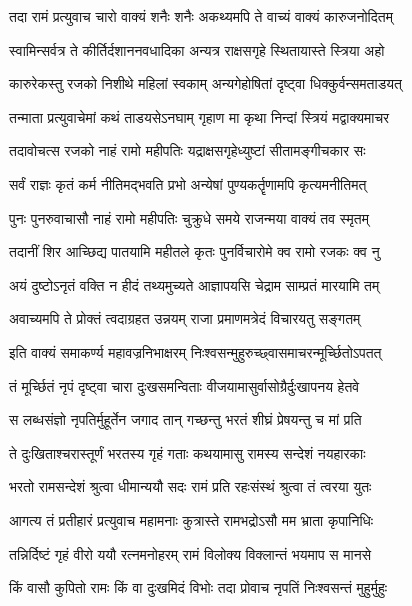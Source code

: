 \twolineshloka
{तदा रामं प्रत्युवाच चारो वाक्यं शनैः शनैः}
{अकथ्यमपि ते वाच्यं वाक्यं कारुजनोदितम्}%


\twolineshloka
{स्वामिन्सर्वत्र ते कीर्तिर्दशाननवधादिका}
{अन्यत्र राक्षसगृहे स्थितायास्ते स्त्रिया अहो}%

\twolineshloka
{कारुरेकस्तु रजको निशीथे महिलां स्वकाम्}
{अन्यगेहोषितां दृष्ट्वा धिक्कुर्वन्समताडयत्}%

\twolineshloka
{तन्माता प्रत्युवाचेमां कथं ताडयसेऽनघाम्}
{गृहाण मा कृथा निन्दां स्त्रियं मद्वाक्यमाचर}%

\twolineshloka
{तदावोचत्स रजको नाहं रामो महीपतिः}
{यद्राक्षसगृहेध्युष्टां सीतामङ्गीचकार सः}%

\twolineshloka
{सर्वं राज्ञः कृतं कर्म नीतिमद्भवति प्रभो}
{अन्येषां पुण्यकर्तॄणामपि कृत्यमनीतिमत्}%

\twolineshloka
{पुनः पुनरुवाचासौ नाहं रामो महीपतिः}
{चुक्रुधे समये राजन्मया वाक्यं तव स्मृतम्}%

\twolineshloka
{तदानीं शिर आच्छिद्य पातयामि महीतले}
{कृतः पुनर्विचारोमे क्व रामो रजकः क्व नु}%

\twolineshloka
{अयं दुष्टोऽनृतं वक्ति न हीदं तथ्यमुच्यते}
{आज्ञापयसि चेद्राम साम्प्रतं मारयामि तम्}%

\twolineshloka
{अवाच्यमपि ते प्रोक्तं त्वदाग्रहत उन्नयम्}
{राजा प्रमाणमत्रेदं विचारयतु सङ्गतम्}%


\twolineshloka
{इति वाक्यं समाकर्ण्य महावज्रनिभाक्षरम्}
{निःश्वसन्मुहुरुच्छ्वासमाचरन्मूर्च्छितोऽपतत्}%

\twolineshloka
{तं मूर्च्छितं नृपं दृष्ट्वा चारा दुःखसमन्विताः}
{वीजयामासुर्वासोग्रैर्दुःखापनय हेतवे}%

\twolineshloka
{स लब्धसंज्ञो नृपतिर्मुहूर्तेन जगाद तान्}
{गच्छन्तु भरतं शीघ्रं प्रेषयन्तु च मां प्रति}%

\twolineshloka
{ते दुःखिताश्चरास्तूर्णं भरतस्य गृहं गताः}
{कथयामासु रामस्य सन्देशं नयहारकाः}%

\twolineshloka
{भरतो रामसन्देशं श्रुत्वा धीमान्ययौ सदः}
{रामं प्रति रहःसंस्थं श्रुत्वा तं त्वरया युतः}%

\twolineshloka
{आगत्य तं प्रतीहारं प्रत्युवाच महामनाः}
{कुत्रास्ते रामभद्रोऽसौ मम भ्राता कृपानिधिः}%

\twolineshloka
{तन्निर्दिष्टं गृहं वीरो ययौ रत्नमनोहरम्}
{रामं विलोक्य विक्लान्तं भयमाप स मानसे}%

\twolineshloka
{किं वासौ कुपितो रामः किं वा दुःखमिदं विभोः}
{तदा प्रोवाच नृपतिं निःश्वसन्तं मुहुर्मुहुः}%

